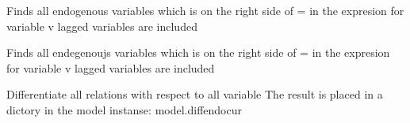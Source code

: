 \documentclass[letterpaper,10pt,english]{sphinxmanual}
\begin{document}
\begin{fulllineitems}
\label{\detokenize{unsorted/modeldiff:modeldiff.findallvar}}
\pysigstartsignatures
{}
\pysigstopsignatures
\sphinxAtStartPar
Finds all endogenous variables which is on the right side of = in the expresion for variable v
lagged variables are included

\end{fulllineitems}


\begin{fulllineitems}
\label{\detokenize{unsorted/modeldiff:modeldiff.findendocur}}
\pysigstartsignatures
{}
\pysigstopsignatures
\sphinxAtStartPar
Finds all endegenoujs variables which is on the right side of = in the expresion for variable v
lagged variables are  included

\end{fulllineitems}


\begin{fulllineitems}
\label{\detokenize{unsorted/modeldiff:modeldiff.modeldiff}}
\pysigstartsignatures
{}
\pysigstopsignatures
\sphinxAtStartPar
Differentiate all relations with respect to all variable
The result is placed in a dictory in the model instanse: model.diffendocur

\end{fulllineitems}

\end{document}
